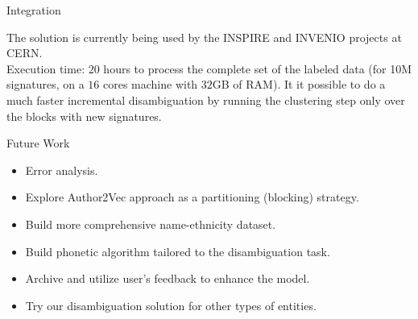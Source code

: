 \documentclass{beamer}
\begin{document}

\begin{frame}{Integration}

The solution is currently being used by the INSPIRE and INVENIO projects at CERN. \\[1em]

Execution time: $20$ hours to process the complete set of the labeled data (for 10M
signatures, on a $16$ cores machine with $32$GB of RAM). It it possible to do
a much faster incremental disambiguation by running the clustering step only over the blocks
with new signatures.

\end{frame}


\begin{frame}{Future Work}

\begin{itemize}

\item Error analysis.\\[1em]

\item Explore Author2Vec approach as a partitioning (blocking) strategy.\\[1em]

\item Build more comprehensive name-ethnicity dataset. \\[1em]

\item Build phonetic algorithm tailored to the disambiguation task. \\[1em]

\item Archive and utilize user's feedback to enhance the model. \\[1em]

\item Try our disambiguation solution for other types of entities. 

\end{itemize}

\end{frame}
\end{document}
